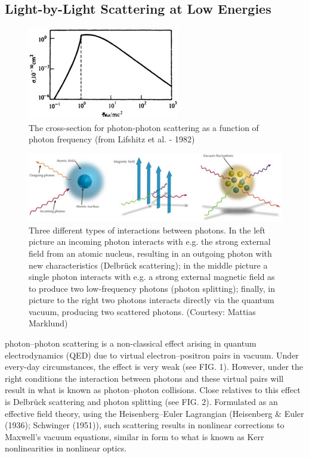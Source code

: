\documentclass{article}
\begin{document}
\subsection{Light-by-Light Scattering at Low Energies}%
\begin{figure}[!th]
	\centering
	\includegraphics[width=0.5\linewidth]{figures/photon-photon-scattering.jpg}
	\caption{The cross-section for photon-photon scattering as a function of photon frequency (from Lifshitz et al. - 1982) }
	\label{fig:corss-secction}
\end{figure}
\begin{figure}[!th]
	\centering
	\includegraphics[width=0.6\linewidth]{figures/photons.jpg}
	\caption{Three different types of interactions between photons. In the left picture an incoming photon interacts with e.g. the strong external field from an atomic nucleus, resulting in an outgoing photon with new characteristics (Delbrück scattering); in the middle picture a single photon interacts with e.g. a strong external magnetic field as to produce two low-frequency photons (photon splitting); finally, in picture to the right two photons interacts directly via the quantum vacuum, producing two scattered photons. (Courtesy: Mattias Marklund)}
	\label{fig:photon-types}
\end{figure}
photon–photon scattering is a non-classical effect arising in quantum electrodynamics (QED) due to virtual electron–positron pairs in vacuum. Under every-day circumstances, the effect is very weak (see FIG. 1). However, under the right conditions the interaction between photons and these virtual pairs will result in what is known as photon–photon collisions. Close relatives to this effect is Delbrück scattering and photon splitting (see FIG. 2). Formulated as an effective field theory, using the Heisenberg–Euler Lagrangian (Heisenberg \& Euler (1936); Schwinger (1951)), such scattering results in nonlinear corrections to Maxwell’s vacuum equations, similar in form to what is known as Kerr nonlinearities in nonlinear optics.
\end{document}
